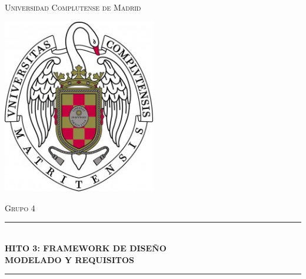 \documentclass[12pt]{article}
\begin{document}
\begin{titlepage}

\newcommand{\HRule}{\rule{\linewidth}{0.5mm}} 

\center %
 
 

\textsc{\LARGE Universidad Complutense de Madrid}\\[0.1cm] %

\begin{center}
	\centering
	\includegraphics[width=0.5\textwidth]{logo}
\end{center}
 
 

\textsc{\LARGE Grupo 4}\\[0.1cm] %



\HRule \\[0.4cm]
{ \huge \bfseries HITO 3: FRAMEWORK DE DISEÑO }\\[0.4cm] %
{ \huge \bfseries MODELADO Y REQUISITOS}\\[0.2cm] %
\HRule \\[1.2cm]
 

\end{titlepage}
\end{document}
